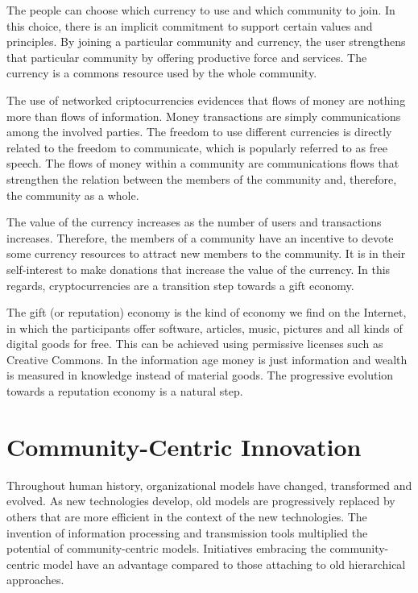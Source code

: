 \documentclass[journal]{IEEEtran}
\begin{document}
The people can choose which currency to use and which community to join.
In this choice, there is an implicit commitment to support certain values and principles.
By joining a particular community and currency, the user strengthens that particular community by offering productive force and services.
The currency is a commons resource used by the whole community.

The use of networked criptocurrencies evidences that flows of money are nothing more than flows of information.
Money transactions are simply communications among the involved parties.
The freedom to use different currencies is directly related to the freedom to communicate, which is popularly referred to as free speech.
The flows of money within a community are communications flows that strengthen the relation between the members of the community and, therefore, the community as a whole.

The value of the currency increases as the number of users and transactions increases.
Therefore, the members of a community have an incentive to devote some currency resources to attract new members to the community.
It is in their self-interest to make donations that increase the value of the currency.
In this regards, cryptocurrencies are a transition step towards a gift economy.

The gift (or reputation) economy is the kind of economy we find on the Internet, in which the participants offer software, articles, music, pictures and all kinds of digital goods for free.
This can be achieved using permissive licenses such as Creative Commons.
In the information age money is just information and wealth is measured in knowledge instead of material goods.
The progressive evolution towards a reputation economy is a natural step.

\section{Community-Centric Innovation}
\label{sec:other}

Throughout human history, organizational models have changed, transformed and evolved.
As new technologies develop, old models are progressively replaced by others that are more efficient in the context of the new technologies.
The invention of information processing and transmission tools multiplied the potential of community-centric models.
Initiatives embracing the community-centric model have an advantage compared to those attaching to old hierarchical approaches.
\end{document}
